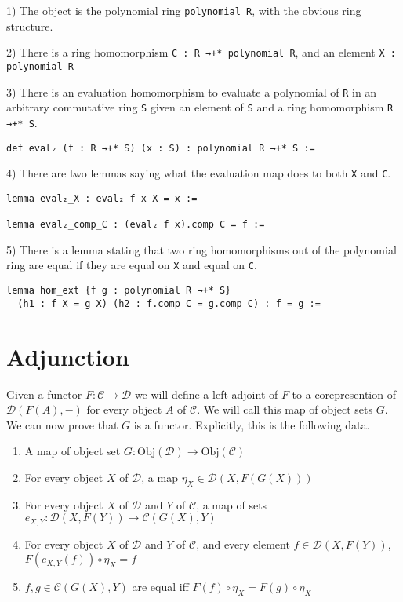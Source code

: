 \documentclass[12pt]{article} %
\theoremstyle{definition}
\theoremstyle{definition}
\theoremstyle{definition}
\theoremstyle{definition}
\begin{document}
1) The object is the polynomial ring \lstinline{polynomial R}, with the obvious ring structure.

2) There is a ring homomorphism \lstinline{C : R →+* polynomial R}, and an element 
\lstinline{X : polynomial R}

3) There is an evaluation homomorphism to evaluate a polynomial of \lstinline{R} in 
an arbitrary commutative ring \lstinline{S} given an element of \lstinline{S} and 
a ring homomorphism \lstinline{R →+* S}.
\begin{lstlisting}
def eval₂ (f : R →+* S) (x : S) : polynomial R →+* S :=
\end{lstlisting}

4) There are two lemmas saying what the evaluation map does to both \lstinline{X} and 
\lstinline{C}.
\begin{lstlisting}
lemma eval₂_X : eval₂ f x X = x :=

lemma eval₂_comp_C : (eval₂ f x).comp C = f :=
\end{lstlisting}

5) There is a lemma stating that two ring homomorphisms out of the polynomial ring are 
equal if they are equal on \lstinline{X} and equal on \lstinline{C}.
\begin{lstlisting}
lemma hom_ext {f g : polynomial R →+* S} 
  (h1 : f X = g X) (h2 : f.comp C = g.comp C) : f = g :=
\end{lstlisting}

\section{Adjunction}

Given a functor $F : \mathcal{C} \to \mathcal{D}$ we will define a left adjoint of $F$ to 
a corepresention of $\mathcal{D}(F(A),-)$ for every object $A$ of $\mathcal{C}$. We will call
this map of object sets $G$. We can now prove that $G$ is a functor. Explicitly,
this is the following data.

\begin{enumerate}
  \item A map of object set $G : \text{Obj}(\mathcal{D})\to \text{Obj}(\mathcal{C})$
  \item For every object $X$ of $\mathcal{D}$, a map $\eta_X \in \mathcal{D}(X, F(G(X)))$
  \item For every object $X$ of $\mathcal{D}$ and $Y$ of $\mathcal{C}$, 
    a map of sets $e_{X,Y} : \mathcal{D}(X, F(Y)) \to \mathcal{C}(G(X), Y)$
  \item For every object $X$ of $\mathcal{D}$ and $Y$ of $\mathcal{C}$, 
    and every element $f \in \mathcal{D}(X, F(Y))$, $F(e_{X,Y}(f)) \circ \eta_X = f$
  \item $f,g \in \mathcal{C}(G(X), Y)$ are equal iff $F(f) \circ \eta_X = F(g) \circ \eta_X$
\end{enumerate}
\end{document}
